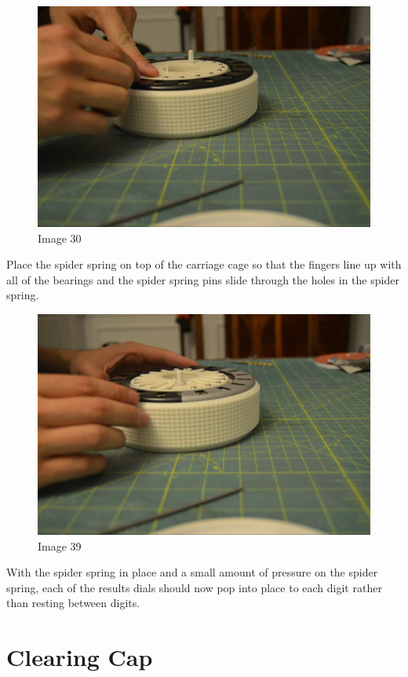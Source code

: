 \documentclass[openany]{book}
\begin{document}
\begin{figure}[!ht]
	\centering
	\includegraphics[width=.75\textwidth]{images/image30.jpg}
	\caption{Image 30}
	\label{fig:image30}	
\end{figure}


Place the spider spring on top of the carriage cage so that the fingers line up with all of the bearings and the spider spring pins slide through the holes in the spider spring.


\begin{figure}[!ht]
	\centering
	\includegraphics[width=.75\textwidth]{images/image39.jpg}
	\caption{Image 39}
	\label{fig:image39}	
\end{figure}


With the spider spring in place and a small amount of pressure on the spider spring, each of the results dials should now pop into place to each digit rather than resting between digits.



\chapter{Clearing Cap}
\end{document}
